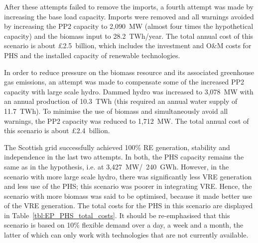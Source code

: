 After these attempts failed to remove the imports, a fourth attempt was made by increasing the base load capacity.
Imports were removed and all warnings avoided by increasing the PP2 capacity to 2,090~MW (almost four times the hypothetical capacity) and the biomass input to 28.2~TWh/year.
The total annual cost of this scenario is about £2.5~billion, which includes the investment and O\&M costs for PHS and the installed capacity of renewable technologies.

In order to reduce pressure on the biomass resource and its associated greenhouse gas emissions, an attempt was made to compensate some of the increased PP2 capacity with large scale hydro.
Dammed hydro was increased to 3,078~MW with an annual production of 10.3~TWh (this required an annual water supply of 11.7~TWh).
To minimise the use of biomass and simultaneously avoid all warnings, the PP2 capacity was reduced to 1,712~MW.
The total annual cost of this scenario is about £2.4~billion.

The Scottish grid successfully achieved 100\% RE generation, stability and independence in the last two attempts.
In both, the PHS capacity remains the same as in the hypothesis, i.e. at 3,427~MW/~240~GWh.
However, in the scenario with more large scale hydro, there was significantly less VRE generation and less use of the PHS; this scenario was poorer in integrating VRE.
Hence, the scenario with more biomass was said to be optimised, because it made better use of the VRE generation.
The total costs for the PHS in this scenario are displayed in Table~\ref{tbl:EP_PHS_total_costs}.
It should be re-emphasised that this scenario is based on 10\% flexible demand over a day, a week and a month, the latter of which can only work with technologies that are not currently available.

